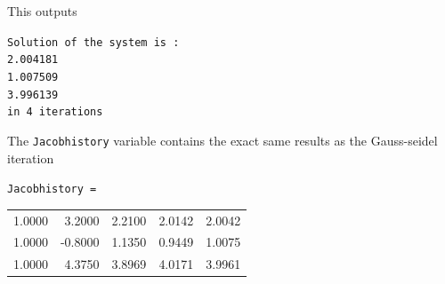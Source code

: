 \documentclass[a4paper]{article}
\begin{document}
\begin{enumerate}[label=\alph*)]
        This outputs 
        
        \texttt{Solution of the system is :  \\
            2.004181 \\
            1.007509 \\
            3.996139 \\
            in 4 iterations}

        The \texttt{Jacobhistory} variable contains the exact same results as
            the Gauss-seidel iteration

        \texttt{Jacobhistory =} \\
        \begin{tabular}{r r r r r}
            1.0000 &  3.2000 & 2.2100 & 2.0142 & 2.0042 \\
            1.0000 & -0.8000 & 1.1350 & 0.9449 & 1.0075 \\
            1.0000 &  4.3750 & 3.8969 & 4.0171 & 3.9961 \\
        \end{tabular}

\end{enumerate}




%
\end{document}
